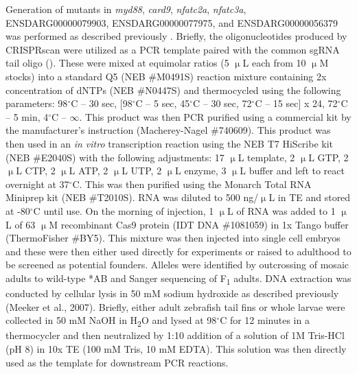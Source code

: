 Generation of mutants in \textit{myd88}, \textit{card9}, \textit{nfatc2a}, \textit{nfatc3a}, ENSDARG00000079903, ENSDARG00000077975, and ENSDARG00000056379 was performed as described previously \citep{MorenoMateos2015}. Briefly, the oligonucleotides produced by CRISPRscan were utilized as a PCR template paired with the common sgRNA tail oligo (). These were mixed at equimolar ratios (5 $\upmu$L each from 10 $\upmu$M stocks) into a standard Q5 (NEB \#M0491S) reaction mixture containing 2x concentration of dNTPs (NEB \#N0447S) and thermocycled using the following parameters: 98$^{\circ}$C -- 30 sec, [98$^{\circ}$C -- 5 sec, 45$^{\circ}$C -- 30 sec, 72$^{\circ}$C -- 15 sec] x 24, 72$^{\circ}$C -- 5 min, 4$^{\circ}$C -- $\infty$. This product was then PCR purified using a commercial kit by the manufacturer's instruction (Macherey\hyp{}Nagel \#740609). This product was then used in an \textit{in vitro} transcription reaction using the NEB T7 HiScribe kit (NEB \#E2040S) with the following adjustments: 17 $\upmu$L template, 2 $\upmu$L GTP, 2 $\upmu$L CTP, 2 $\upmu$L ATP, 2 $\upmu$L UTP, 2 $\upmu$L enzyme, 3 $\upmu$L buffer and left to react overnight at 37$^{\circ}$C. This was then purified using the Monarch Total RNA Miniprep kit (NEB \#T2010S). RNA was diluted to 500 ng/$\upmu$L in TE and stored at \hyp{}80$^{\circ}$C until use. On the morning of injection, 1 $\upmu$L of RNA was added to 1 $\upmu$L of 63 $\upmu$M recombinant Cas9 protein (IDT DNA \#1081059) in 1x Tango buffer (ThermoFisher \#BY5). This mixture was then injected into single cell embryos and these were then either used directly for experiments or raised to adulthood to be screened as potential founders. Alleles were identified by outcrossing of mosaic adults to wild\hyp{}type *AB and Sanger sequencing of F\textsubscript{1} adults. DNA extraction was conducted by cellular lysis in 50 mM sodium hydroxide as described previously (Meeker et al., 2007). Briefly, either adult zebrafish tail fins or whole larvae were collected in 50 mM NaOH in H\textsubscript{2}O and lysed at 98$^{\circ}$C for 12 minutes in a thermocycler and then neutralized by 1:10 addition of a solution of 1M Tris\hyp{}HCl (pH 8) in 10x TE (100 mM Tris, 10 mM EDTA). This solution was then directly used as the template for downstream PCR reactions. 


